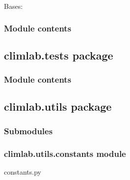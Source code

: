 \documentclass[letterpaper,10pt,english]{sphinxmanual}
\begin{document}

\begin{fulllineitems}
\label{api/climlab.surface:climlab.surface.turbulent.SurfaceFlux}
Bases: {\hyperref[api/climlab.process:climlab.process.energy_budget.EnergyBudget]{\emph{}}}

\end{fulllineitems}



\subsubsection{Module contents}
\label{api/climlab.surface:module-climlab.surface}\label{api/climlab.surface:module-contents}

\subsection{climlab.tests package}
\label{api/climlab.tests::doc}\label{api/climlab.tests:climlab-tests-package}

\subsubsection{Module contents}
\label{api/climlab.tests:module-climlab.tests}\label{api/climlab.tests:module-contents}

\subsection{climlab.utils package}
\label{api/climlab.utils::doc}\label{api/climlab.utils:climlab-utils-package}

\subsubsection{Submodules}
\label{api/climlab.utils:submodules}

\subsubsection{climlab.utils.constants module}
\label{api/climlab.utils:module-climlab.utils.constants}\label{api/climlab.utils:climlab-utils-constants-module}
constants.py
\end{document}
